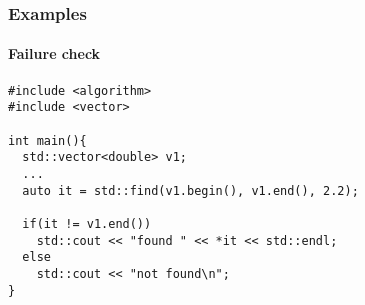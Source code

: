 \begin{frame}[fragile]
  \frametitle{Examples}
  \framesubtitle{Failure check}
\begin{lstlisting}
#include <algorithm>
#include <vector>
  
int main(){
  std::vector<double> v1;
  ...
  auto it = std::find(v1.begin(), v1.end(), 2.2);

  if(it != v1.end())
    std::cout << "found " << *it << std::endl;
  else
    std::cout << "not found\n";
}
  
\end{lstlisting}
\end{frame}
